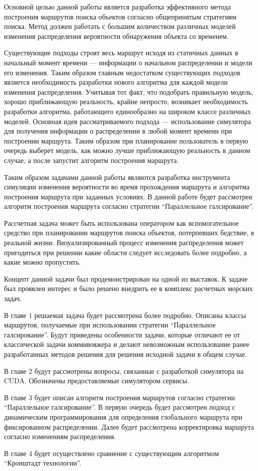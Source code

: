 \startprefacepage

Основной целью данной работы является разработка эффективного метода построения маршрутов поиска
объектов согласно общепринятым стратегиям поиска. Метод должен работать с большим количеством
различных моделей изменения распределения вероятности обнаружения объекта со временем. %
 
 Существующие подходы строят весь маршрут исходя из статичных данных в начальный момент
времени --- информации о начальном распределении и модели его изменения.
Таким образом главным недостатком существующих подходов является необходимость
разработки нового алгоритма для каждой модели изменения распределения.
Учитывая тот факт, что подобрать правильную модель, хорошо приближающую реальность,
 крайне непросто, возникает необходимость разработки алгоритма,
 работающего единообразно на широком классе различных моделей.
 Основная идея рассматриваемого подхода --- использование симулятора для получения %
 информации о распределении в любой момент времени при построении маршрута.
 Таким образом при планирование пользователь в первую очередь выберет модель,
 как можно лучше приближающую реальность в данном случае, а после запустит
 алгоритм построения маршрута.

 Таким образом задачами данной работы являются разработка инструмента симуляции изменения
вероятности во время прохождения маршрута и алгоритма построения маршрута при заданных условиях.
В данной работе будет рассмотрен алгоритм построения маршрута согласно
 стратегии ``Параллельное галсирование''.

Рассчетная задача может быть использована оператором как вспомогательное средство
при планировании маршрутов поиска объектов, потерпевших бедствие, в реальной жизни.
Визуализированный процесс изменения распределения может пригодиться при решении какие области
следует исследовать более подробно, а какие можно пропустить.

Концепт данной задачи был продемонстрирован на одной из выставок. К задаче был проявлен 
интерес и было решено внедрить ее в комплекс расчетных морских задач. %

В главе 1 решаемая задача будет рассмотрена более подробно.
 Описаны классы маршрутов, получаемые при использовании стратегии ``Параллельное галсирование''. 
Будут приведены особенности задачи, которые отличают ее от классической задачи коммивояжера
 и делают невозможным использование ранее разработанных методов решения
 для решения исходной задачи в общем случае.

В главе 2 будут рассмотрены вопросы, связанные с разработкой симулятора на CUDA.
 Обозначены предоставляемые симулятором сервисы.

В главе 3 будет описан алгоритм построения маршрутов согласно стратегии ``Параллельное галсирование''.
В первую очередь будет рассмотрен подход с динамическим программирования для определения
глобального маршрута при фиксированном распределении. Далее будет рассмотрена корректировка маршрута
согласно изменениям распределения.

В главе 4 будет осуществлено сравнение с существующим алгоритмом ``Кронштадт технологии''.
\FloatBarrier
